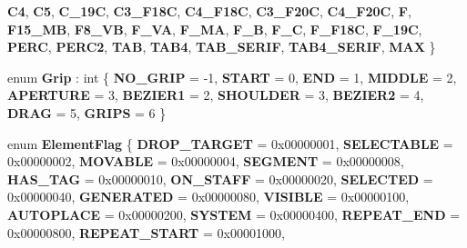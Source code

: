 \begin{DoxyCompactItemize}
\newline
{\bfseries C4}, 
{\bfseries C5}, 
{\bfseries C\+\_\+19C}, 
{\bfseries C3\+\_\+\+F18C}, 
\newline
{\bfseries C4\+\_\+\+F18C}, 
{\bfseries C3\+\_\+\+F20C}, 
{\bfseries C4\+\_\+\+F20C}, 
{\bfseries F}, 
\newline
{\bfseries F15\+\_\+\+MB}, 
{\bfseries F8\+\_\+\+VB}, 
{\bfseries F\+\_\+VA}, 
{\bfseries F\+\_\+MA}, 
\newline
{\bfseries F\+\_\+B}, 
{\bfseries F\+\_\+C}, 
{\bfseries F\+\_\+\+F18C}, 
{\bfseries F\+\_\+19C}, 
\newline
{\bfseries P\+E\+RC}, 
{\bfseries P\+E\+R\+C2}, 
{\bfseries T\+AB}, 
{\bfseries T\+A\+B4}, 
\newline
{\bfseries T\+A\+B\+\_\+\+S\+E\+R\+IF}, 
{\bfseries T\+A\+B4\+\_\+\+S\+E\+R\+IF}, 
{\bfseries M\+AX}
 \}
\item 
\mbox{\label{namespace_ms_ad066cb68f801b1f09ebda38edf1c493a}} 
enum {\bfseries Grip} \+: int \{ \newline
{\bfseries N\+O\+\_\+\+G\+R\+IP} = -\/1, 
{\bfseries S\+T\+A\+RT} = 0, 
{\bfseries E\+ND} = 1, 
{\bfseries M\+I\+D\+D\+LE} = 2, 
\newline
{\bfseries A\+P\+E\+R\+T\+U\+RE} = 3, 
{\bfseries B\+E\+Z\+I\+E\+R1} = 2, 
{\bfseries S\+H\+O\+U\+L\+D\+ER} = 3, 
{\bfseries B\+E\+Z\+I\+E\+R2} = 4, 
\newline
{\bfseries D\+R\+AG} = 5, 
{\bfseries G\+R\+I\+PS} = 6
 \}
\item 
\mbox{\label{namespace_ms_a02cda2a18206af7dc3efbd0db9142e22}} 
enum {\bfseries Element\+Flag} \{ \newline
{\bfseries D\+R\+O\+P\+\_\+\+T\+A\+R\+G\+ET} = 0x00000001, 
{\bfseries S\+E\+L\+E\+C\+T\+A\+B\+LE} = 0x00000002, 
{\bfseries M\+O\+V\+A\+B\+LE} = 0x00000004, 
{\bfseries S\+E\+G\+M\+E\+NT} = 0x00000008, 
\newline
{\bfseries H\+A\+S\+\_\+\+T\+AG} = 0x00000010, 
{\bfseries O\+N\+\_\+\+S\+T\+A\+FF} = 0x00000020, 
{\bfseries S\+E\+L\+E\+C\+T\+ED} = 0x00000040, 
{\bfseries G\+E\+N\+E\+R\+A\+T\+ED} = 0x00000080, 
\newline
{\bfseries V\+I\+S\+I\+B\+LE} = 0x00000100, 
{\bfseries A\+U\+T\+O\+P\+L\+A\+CE} = 0x00000200, 
{\bfseries S\+Y\+S\+T\+EM} = 0x00000400, 
{\bfseries R\+E\+P\+E\+A\+T\+\_\+\+E\+ND} = 0x00000800, 
\newline
{\bfseries R\+E\+P\+E\+A\+T\+\_\+\+S\+T\+A\+RT} = 0x00001000, 

\end{DoxyCompactItemize}

